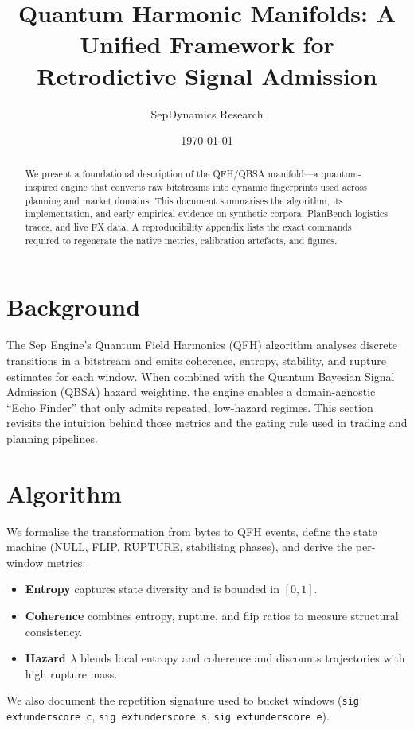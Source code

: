 \documentclass[11pt]{article}
\title{Quantum Harmonic Manifolds: A Unified Framework for Retrodictive Signal Admission}
\author{SepDynamics Research}
\date{\today}
\begin{document}
\maketitle

\begin{abstract}
We present a foundational description of the QFH/QBSA manifold---a quantum-inspired engine that converts raw bitstreams into dynamic fingerprints used across planning and market domains. This document summarises the algorithm, its implementation, and early empirical evidence on synthetic corpora, PlanBench logistics traces, and live FX data. A reproducibility appendix lists the exact commands required to regenerate the native metrics, calibration artefacts, and figures.
\end{abstract}

\section{Background}
The Sep Engine's Quantum Field Harmonics (QFH) algorithm analyses discrete transitions in a bitstream and emits coherence, entropy, stability, and rupture estimates for each window. When combined with the Quantum Bayesian Signal Admission (QBSA) hazard weighting, the engine enables a domain-agnostic ``Echo Finder'' that only admits repeated, low-hazard regimes. This section revisits the intuition behind those metrics and the gating rule used in trading and planning pipelines.

\section{Algorithm}
We formalise the transformation from bytes to QFH events, define the state machine (NULL, FLIP, RUPTURE, stabilising phases), and derive the per-window metrics:
\begin{itemize}
  \item \textbf{Entropy} captures state diversity and is bounded in $[0,1]$.
  \item \textbf{Coherence} combines entropy, rupture, and flip ratios to measure structural consistency.
  \item \textbf{Hazard $\lambda$} blends local entropy and coherence and discounts trajectories with high rupture mass.
\end{itemize}
We also document the repetition signature used to bucket windows (\texttt{sig	extunderscore c}, \texttt{sig	extunderscore s}, \texttt{sig	extunderscore e}).
\end{document}
